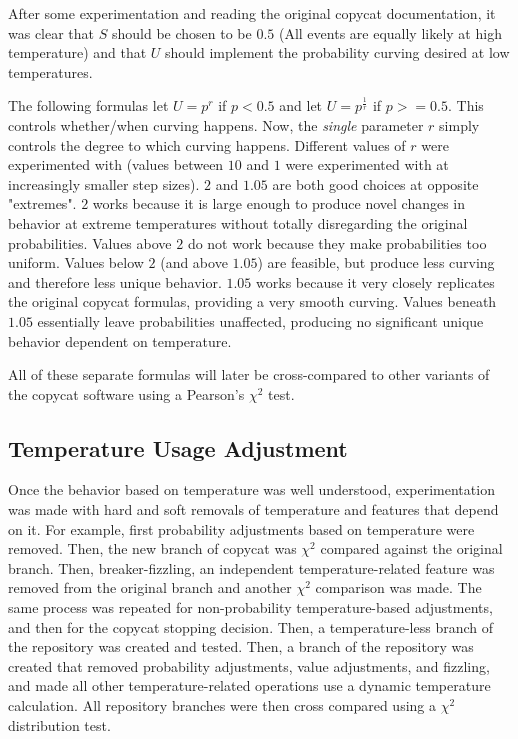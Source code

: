 \documentclass[a4paper]{article}
\begin{document}
        

        After some experimentation and reading the original copycat documentation, it was clear that $S$ should be chosen to be $0.5$ (All events are equally likely at high temperature) and that $U$ should implement the probability curving desired at low temperatures. 

        The following formulas let $U = p^r$ if $p < 0.5$ and let $U = p^\frac{1}{r}$ if $p >= 0.5$.
        This controls whether/when curving happens.
        Now, the \emph{single} parameter $r$ simply controls the degree to which curving happens.
        Different values of $r$ were experimented with (values between $10$ and $1$ were experimented with at increasingly smaller step sizes).
        $2$ and $1.05$ are both good choices at  opposite "extremes".
        $2$ works because it is large enough to produce novel changes in behavior at extreme temperatures without totally disregarding the original probabilities.
        Values above $2$ do not work because they make probabilities too uniform.
        Values below $2$ (and above $1.05$) are feasible, but produce less curving and therefore less unique behavior.
        $1.05$ works because it very closely replicates the original copycat formulas, providing a very smooth curving.
        Values beneath $1.05$ essentially leave probabilities unaffected, producing no significant unique behavior dependent on temperature.

        

        All of these separate formulas will later be cross-compared to other variants of the copycat software using a Pearson's $\chi^2$ test.

    \subsection{Temperature Usage Adjustment}

        Once the behavior based on temperature was well understood, experimentation was made with hard and soft removals of temperature and features that depend on it.
        For example, first probability adjustments based on temperature were removed.
        Then, the new branch of copycat was $\chi^2$ compared against the original branch.
        Then, breaker-fizzling, an independent temperature-related feature was removed from the original branch and another $\chi^2$ comparison was made.
        The same process was repeated for non-probability temperature-based adjustments, and then for the copycat stopping decision.
        Then, a temperature-less branch of the repository was created and tested.
        Then, a branch of the repository was created that removed probability adjustments, value adjustments, and fizzling, and made all other temperature-related operations use a dynamic temperature calculation.
        All repository branches were then cross compared using a $\chi^2$ distribution test.
\end{document}
